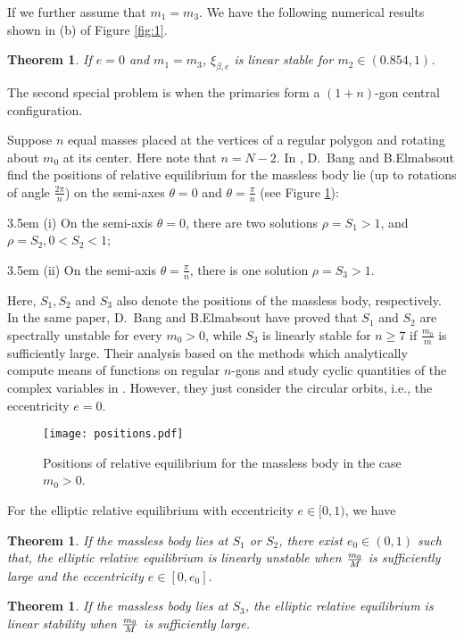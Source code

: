\documentclass[11pt]{article}
\newtheorem{theorem}[lemma]{Theorem}
\def\lb{\label}
\def\bb{{\beta}}
\def\th{{\theta}}
\begin{document}
If we further assume that $m_1 = m_3$. 
We have the following numerical results shown in (b) of Figure \ref{fig:1}.
\begin{theorem}\lb{thm:numerically}
  If $e = 0$ and $m_1 = m_3$, $\xi_{\bb,e}$ is linear stable for $m_2 \in (0.854,1)$.
\end{theorem}

The second special problem is when the primaries form a $(1+n)$-gon central configuration.

Suppose $n$ equal masses placed at the vertices of a regular polygon and rotating about $m_0$ at its center.
Here note that $n=N-2$.
In \cite{BaE},
D.~Bang and B.Elmabsout find the positions of relative equilibrium for the massless body lie 
(up to rotations of angle $\frac{2\pi}{n}$)
on the semi-axes $\th=0$ and $\th=\frac{\pi}{n}$
(see Figure \ref{fig:2}):

\hangindent 3.5em
\;(i) On the semi-axis $\th=0$, there are two solutions
$\rho=S_1>1$, and $\rho=S_2,0<S_2<1$;

\hangindent 3.5em
(ii) On the semi-axis $\th=\frac{\pi}{n}$, there is one solution
$\rho=S_3>1$.

\noindent Here, $S_1,S_2$ and $S_3$ also denote the 
positions of the massless body, respectively.
In the same paper,
D.~Bang and B.Elmabsout have proved that $S_1$ and $S_2$
are spectrally unstable for every $m_0>0$,
while $S_3$ is linearly stable for $n\ge7$ if
$\frac{m_0}{m}$ is sufficiently large.
Their analysis based on the methods which
analytically compute means of functions on regular $n$-gons
and study cyclic quantities of the complex variables in
\cite{BaE2}.
However, they just consider the circular orbits,
i.e., the eccentricity $e=0$.

\begin{figure}[htbp]
	\centering
    \texttt{[image: positions.pdf]}
	\caption{Positions of relative equilibrium for the massless body in the case $m_0>0$.}
	\label{fig:2}
\end{figure}

For the elliptic relative equilibrium
with eccentricity $e\in[0,1)$, we have
\begin{theorem}\label{no stability of S_1 and s_2 }
If the massless body lies at $S_1$ or $S_2$,
there exist $e_0\in(0,1)$ such that,
    the elliptic relative equilibrium is linearly unstable when ${m_0\over M}$ is sufficiently large and the eccentricity $e\in [0,e_0]$.
\end{theorem}
\begin{theorem}\label{stability of S_3}
If the massless body lies at $S_3$,
    the elliptic relative equilibrium is linear stability when ${m_0\over M}$ is sufficiently large.
\end{theorem}
\end{document}
